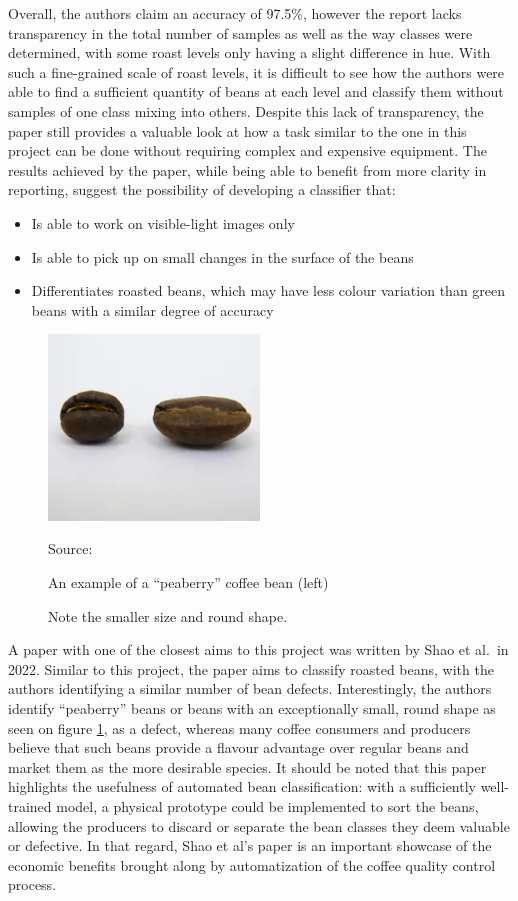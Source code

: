 Overall, the authors claim an accuracy of 97.5\%, however the report lacks transparency in the total number of samples
as well as the way classes were determined, with some roast levels only having a slight difference in hue.
With such a fine-grained scale of roast levels, it is difficult to see how the authors were able to find a sufficient
quantity of beans at each level and classify them without samples of one class mixing into others.
Despite this lack of transparency, the paper still provides a valuable look at how a task similar to the one in this project
can be done without requiring complex and expensive equipment.
The results achieved by the paper, while being able to benefit from more clarity in reporting, suggest the possibility of
developing a classifier that:
\begin{itemize}
    \item Is able to work on visible-light images only
    \item Is able to pick up on small changes in the surface of the beans
    \item Differentiates roasted beans, which may have less colour variation than green beans with a similar degree of accuracy
\end{itemize}

\begin{figure}
    \includegraphics[width=0.5\textwidth]{figures/litReview/peaberry-vs-normal}
    \caption*{Source: \cite{peaberryImg}}
    \caption{An example of a ``peaberry'' coffee bean (left)}
    \caption*{Note the smaller size and round shape.}
    \label{fig:peaberryComparison}
\end{figure}
A paper with one of the closest aims to this project was written by Shao et al.\ in 2022\cite{rgbDeepLearningShao}.
Similar to this project, the paper aims to classify roasted beans, with the authors identifying a similar number of bean defects.
Interestingly, the authors identify ``peaberry'' beans or beans with an exceptionally small, round shape as seen on figure \ref{fig:peaberryComparison},
as a defect, whereas many coffee consumers and producers believe that such beans provide a flavour advantage over regular beans
and market them as the more desirable species.
It should be noted that this paper highlights the usefulness of automated bean classification: with a sufficiently well-trained
model, a physical prototype could be implemented to sort the beans, allowing the producers to discard or separate the bean
classes they deem valuable or defective.
In that regard, Shao et al's paper is an important showcase of the economic benefits brought along by automatization
of the coffee quality control process.

